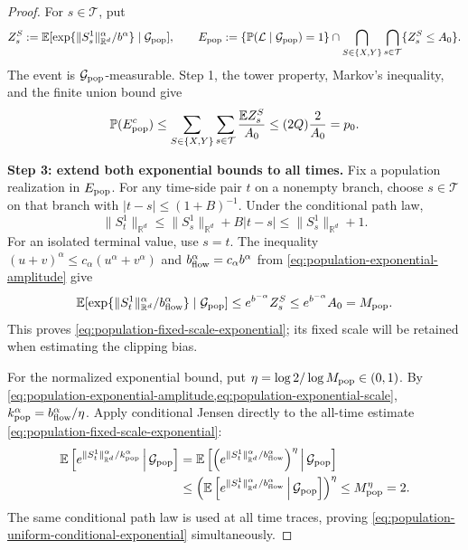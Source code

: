 \begin{proof}
For $s\in\mathcal T$, put
\[
 Z_s^S:=\mathbb E[\exp\{\|S_s^1\|_{\mathbb R^d}^\alpha/b^\alpha\}
                         \mid\mathcal G_{\rm pop}],
 \qquad
 E_{\rm pop}:=
 \{\mathbb P(\mathcal L\mid\mathcal G_{\rm pop})=1\}
 \cap\bigcap_{S\in\{X,Y\}}\bigcap_{s\in\mathcal T}
          \{Z_s^S\le A_0\}.
\]
The event is $\mathcal G_{\rm pop}$-measurable. Step 1, the tower property,
Markov's inequality, and the finite union bound give
\[
 \mathbb P(E_{\rm pop}^c)
 \le\sum_{S\in\{X,Y\}}\sum_{s\in\mathcal T}
       \frac{\mathbb E Z_s^S}{A_0}
 \le(2Q)\frac2{A_0}=p_0.
\]

\par\noindent\textbf{Step 3: extend both exponential bounds to all times.}
Fix a population realization in $E_{\rm pop}$.
For any time-side pair $t$ on a nonempty branch, choose $s\in\mathcal T$
on that branch with $|t-s|\le(1+B)^{-1}$. Under the conditional path law,
\[
 \|S_t^1\|_{\mathbb R^d}\le\|S_s^1\|_{\mathbb R^d}+B|t-s|\le\|S_s^1\|_{\mathbb R^d}+1.
\]
For an isolated terminal value, use $s=t$.
The inequality $(u+v)^\alpha\le c_\alpha(u^\alpha+v^\alpha)$ and
$b_{\rm flow}^\alpha=c_\alpha b^\alpha$ from
\eqref{eq:population-exponential-amplitude} give
\[
 \mathbb E[\exp\{\|S_t^1\|_{\mathbb R^d}^\alpha/b_{\rm flow}^\alpha\}
                         \mid\mathcal G_{\rm pop}]
 \le e^{b^{-\alpha}}Z_s^S
 \le e^{b^{-\alpha}}A_0=M_{\rm pop}.
\]
This proves \eqref{eq:population-fixed-scale-exponential}; its fixed scale
will be retained when estimating the clipping bias.

For the normalized exponential bound, put
$\eta=\log2/\log M_{\rm pop}\in(0,1)$. By
\cref{eq:population-exponential-amplitude,eq:population-exponential-scale},
$k_{\rm pop}^\alpha=b_{\rm flow}^\alpha/\eta$.
Apply conditional Jensen directly to the all-time estimate
\eqref{eq:population-fixed-scale-exponential}:
\[
\begin{aligned}
 \mathbb E\left[e^{\|S_t^1\|_{\mathbb R^d}^\alpha/k_{\rm pop}^\alpha}
                       \,\middle|\,\mathcal G_{\rm pop}\right]
 &=\mathbb E\left[\left(e^{\|S_t^1\|_{\mathbb R^d}^\alpha/b_{\rm flow}^\alpha}\right)^\eta
                       \,\middle|\,\mathcal G_{\rm pop}\right]\\
 &\le\left(\mathbb E\left[e^{\|S_t^1\|_{\mathbb R^d}^\alpha/b_{\rm flow}^\alpha}
                       \,\middle|\,\mathcal G_{\rm pop}\right]\right)^\eta
 \le M_{\rm pop}^\eta=2.
\end{aligned}
\]
The same conditional path law is used at all time traces, proving
\eqref{eq:population-uniform-conditional-exponential} simultaneously.


\end{proof}
